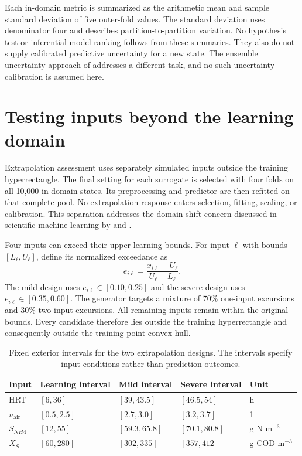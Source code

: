 Each in-domain metric is summarized as the arithmetic mean and sample standard deviation of five outer-fold values. The standard deviation uses denominator four and describes partition-to-partition variation. No hypothesis test or inferential model ranking follows from these summaries. They also do not supply calibrated predictive uncertainty for a new state. The ensemble uncertainty approach of \citet{Lakshminarayanan2017} addresses a different task, and no such uncertainty calibration is assumed here.

\section{Testing inputs beyond the learning domain}

Extrapolation assessment uses separately simulated inputs outside the training hyperrectangle. The final setting for each surrogate is selected with four folds on all 10,000 in-domain states. Its preprocessing and predictor are then refitted on that complete pool. No extrapolation response enters selection, fitting, scaling, or calibration. This separation addresses the domain-shift concern discussed in scientific machine learning by \citet{Karniadakis2021} and \citet{Shen2023}.

Four inputs can exceed their upper learning bounds. For input $\ell$ with bounds $[L_\ell,U_\ell]$, define its normalized exceedance as
\begin{equation}
e_{i\ell}=\frac{x_{i\ell}-U_\ell}{U_\ell-L_\ell}.
\label{eq:projection_domain_exceedance}
\end{equation}
The mild design uses $e_{i\ell}\in[0.10,0.25]$ and the severe design uses $e_{i\ell}\in[0.35,0.60]$. The generator targets a mixture of 70\% one-input excursions and 30\% two-input excursions. All remaining inputs remain within the original bounds. Every candidate therefore lies outside the training hyperrectangle and consequently outside the training-point convex hull.

\begin{table}[htbp]
\centering
\caption{Fixed exterior intervals for the two extrapolation designs. The intervals specify input conditions rather than prediction outcomes.}
\label{tab:reactor_extrapolation_domain}
\small
\begin{tabular}{lllll}
\toprule
Input & Learning interval & Mild interval & Severe interval & Unit\\
\midrule
HRT & $[6,36]$ & $[39,43.5]$ & $[46.5,54]$ & h\\
$u_{\mathrm{air}}$ & $[0.5,2.5]$ & $[2.7,3.0]$ & $[3.2,3.7]$ & 1\\
$S_{NH4}$ & $[12,55]$ & $[59.3,65.8]$ & $[70.1,80.8]$ & g N m$^{-3}$\\
$X_S$ & $[60,280]$ & $[302,335]$ & $[357,412]$ & g COD m$^{-3}$\\
\bottomrule
\end{tabular}
\end{table}

